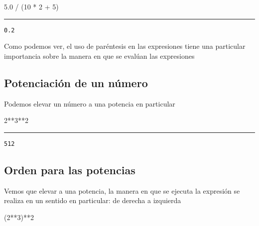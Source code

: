 \documentclass[]{article}
\newenvironment{Shaded}{}{}
\newcommand{\DecValTok}[1]{\textcolor[rgb]{0.25,0.63,0.44}{#1}}
\newcommand{\FloatTok}[1]{\textcolor[rgb]{0.25,0.63,0.44}{#1}}
\newcommand{\OperatorTok}[1]{\textcolor[rgb]{0.40,0.40,0.40}{#1}}
\newcommand{\NormalTok}[1]{#1}
\begin{document}
\begin{Shaded}
\begin{Highlighting}[]
\FloatTok{5.0} \OperatorTok{/}\NormalTok{ (}\DecValTok{10} \OperatorTok{*} \DecValTok{2} \OperatorTok{+} \DecValTok{5}\NormalTok{)}
\end{Highlighting}
\end{Shaded}

\begin{center}\rule{0.5\linewidth}{\linethickness}\end{center}

\begin{verbatim}
0.2
\end{verbatim}

Como podemos ver, el uso de paréntesis en las expresiones tiene una
particular importancia sobre la manera en que se evalúan las expresiones

\subsection{Potenciación de un
número}\label{potenciaciuxf3n-de-un-nuxfamero}

Podemos elevar un número a una potencia en particular

\begin{Shaded}
\begin{Highlighting}[]
\DecValTok{2}\OperatorTok{**}\DecValTok{3}\OperatorTok{**}\DecValTok{2}
\end{Highlighting}
\end{Shaded}

\begin{center}\rule{0.5\linewidth}{\linethickness}\end{center}

\begin{verbatim}
512
\end{verbatim}

\subsection{Orden para las potencias}\label{orden-para-las-potencias}

Vemos que elevar a una potencia, la manera en que se ejecuta la
expresión se realiza en un sentido en particular: de derecha a izquierda

\begin{Shaded}
\begin{Highlighting}[]
\NormalTok{(}\DecValTok{2}\OperatorTok{**}\DecValTok{3}\NormalTok{)}\OperatorTok{**}\DecValTok{2}
\end{Highlighting}
\end{Shaded}
\end{document}
